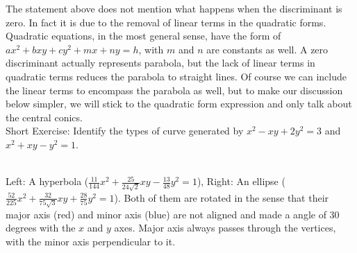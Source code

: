 The statement above does not mention what happens when the discriminant is zero. In fact it is due to the removal of linear terms in the quadratic forms. Quadratic equations, in the most general sense, have the form of $ax^2 + bxy + cy^2 + mx + ny = h$, with $m$ and $n$ are constants as well. A zero discriminant actually represents parabola, but the lack of linear terms in quadratic terms reduces the parabola to straight lines. Of course we can include the linear terms to encompass the parabola as well, but to make our discussion below simpler, we will stick to the quadratic form expression and only talk about the central conics.\\
Short Exercise: Identify the types of curve generated by $x^2 - xy + 2y^2 = 3$ and $x^2 + xy - y^2 = 1$.
\begin{center}
 \\
Left: A hyperbola ($\frac{11}{144}x^2 + \frac{25}{24\sqrt{2}}xy - \frac{13}{48}y^2 = 1$), Right: An ellipse ($\frac{52}{225}x^2 + \frac{32}{75\sqrt{3}}xy + \frac{28}{75}y^2 = 1$). Both of them are rotated in the sense that their major axis (red) and minor axis (blue) are not aligned and made a angle of 30 degrees with the $x$ and $y$ axes. Major axis always passes through the vertices, with the minor axis perpendicular to it.
\end{center}

